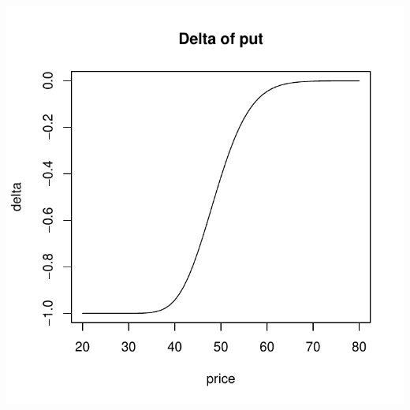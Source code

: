 \documentclass{article}\usepackage[]{graphicx}\usepackage[]{color}
\makeatletter
\def\maxwidth{ %
  \ifdim\Gin@nat@width>\linewidth
    \linewidth
  \else
    \Gin@nat@width
  \fi
}
\newenvironment{knitrout}{}{} %
\makeatother
\begin{document}
\begin{knitrout}
\includegraphics[width=\maxwidth]{figure/unnamed-chunk-92} 

\end{knitrout}
\end{document}
